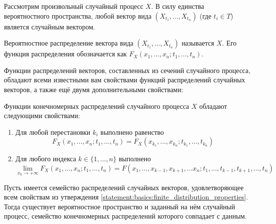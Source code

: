 Рассмотрим произвольный случайный процесс $ X $.
В силу единства вероятностного пространства,
любой вектор вида $ (X_{t_1}, \ldots, X_{t_n}) $ (где $ t_i \in T $) является случайным вектором.

\begin{definition}
    \label{definition:basics:finite_distribution}
    Вероятностное распределение вектора вида $ (X_{t_1}, \ldots, X_{t_n}) $ называется  $ X $.
    Его функция распределения обозначается как $ F_X(x_1, \ldots, x_n; t_1, \ldots, t_n) $.
\end{definition}

Функции распределений векторов, составленных из сечений случайного процесса,
обладают всеми известными вам свойствами функций распределений случайных векторов,
а также ещё двумя дополнительными свойствами:

\begin{statement}
    \label{statement:basics:finite_distribution_properties}
    Функции конечномерных распределений случайного процесса $ X $ обладают следующими свойствами:
    \begin{enumerate}
        \item
            Для любой перестановки $ k_i $ выполнено равенство
            \[
                F_X(x_1, \ldots, x_n; t_1, \ldots, t_n) = F_X(x_{k_1}, \ldots, x_{k_n}; t_{k_1}, \ldots, t_{k_n})
            \]
        \item
            Для любого индекса $ k \in \{1, \ldots, n\} $ выполнено
            \[
                \lim_{x_k \to +\infty} F_X(x_1, \ldots, x_n; t_1, \ldots, t_n) = F(x_1, \ldots, x_{k-1}, x_{k+1}, \ldots x_n; t_1, \ldots, t_{k-1}, t_{k+1}, \ldots, t_n)
            \]
    \end{enumerate}
\end{statement}

\begin{theorem}[Колмогорова]
    \label{theorem:basics:finite_distributions_family_define_stochastic_process}
    Пусть имеется семейство распределений случайных векторов,
    удовлетворяющее всем свойствам из утверждения \ref{statement:basics:finite_distribution_properties}.
    Тогда существует вероятностное пространство и заданный на нём случайный процесс,
    семейство конечномерных распределений которого совпадает с данным.
\end{theorem}

